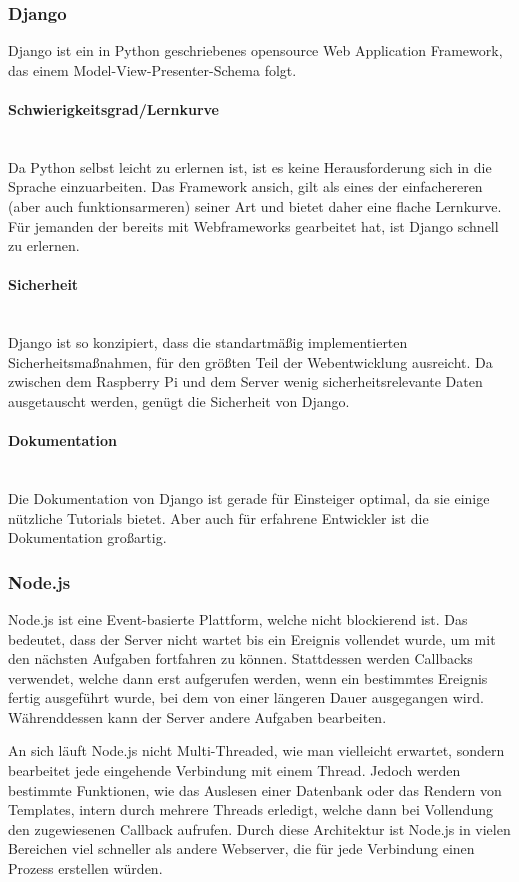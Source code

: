 \subsubsection{Django}
Django ist ein in Python geschriebenes opensource Web Application Framework, das einem Model-View-Presenter-Schema folgt.
\paragraph{Schwierigkeitsgrad/Lernkurve} \mbox{}\\
Da Python selbst leicht zu erlernen ist, ist es keine Herausforderung sich in die Sprache einzuarbeiten. Das Framework ansich, gilt als eines der einfachereren (aber auch funktionsarmeren) seiner Art und bietet daher eine flache Lernkurve. F\"ur jemanden der bereits mit Webframeworks gearbeitet hat, ist Django schnell zu erlernen.
\paragraph{Sicherheit} \mbox{}\\
Django ist so konzipiert, dass die standartm\"a{\ss}ig implementierten Sicherheitsma{\ss}nahmen, f\"ur den gr\"o{\ss}ten Teil der Webentwicklung ausreicht. Da zwischen dem Raspberry Pi und dem Server wenig sicherheitsrelevante Daten ausgetauscht werden, gen\"ugt die Sicherheit von Django.
\paragraph{Dokumentation} \mbox{}\\
Die Dokumentation von Django ist gerade f\"ur Einsteiger optimal, da sie einige n\"utzliche Tutorials bietet. Aber auch f\"ur erfahrene Entwickler ist die Dokumentation gro{\ss}artig.
\newpage

\subsubsection{Node.js}
Node.js ist eine Event-basierte Plattform, welche nicht blockierend ist. Das bedeutet, dass der Server nicht wartet bis ein Ereignis vollendet wurde, um mit den n\"achsten Aufgaben fortfahren zu k\"onnen. Stattdessen werden Callbacks verwendet, welche dann erst aufgerufen werden, wenn ein bestimmtes Ereignis fertig ausgef\"uhrt wurde, bei dem von einer l\"angeren Dauer ausgegangen wird. W\"ahrenddessen kann der Server andere Aufgaben bearbeiten.

An sich l\"auft Node.js nicht Multi-Threaded, wie man vielleicht erwartet, sondern bearbeitet jede eingehende Verbindung mit einem Thread. Jedoch werden bestimmte Funktionen, wie das Auslesen einer Datenbank oder das Rendern von Templates, intern durch mehrere Threads erledigt, welche dann bei Vollendung den zugewiesenen Callback aufrufen. Durch diese Architektur ist Node.js in vielen Bereichen viel schneller als andere Webserver, die f\"ur jede Verbindung einen Prozess erstellen w\"urden.

